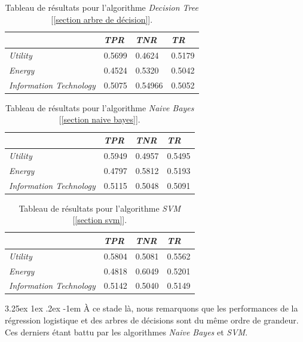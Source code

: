 \documentclass[a4paper, 11pt]{article}
\makeatletter
\renewcommand\paragraph{\@startsection{paragraph}{5}{\z@}%
  {3.25ex \@plus1ex \@minus.2ex}%
  {-1em}%
  {\normalfont\normalsize\bfseries}}
\makeatother
\begin{document}
\begin{table}[h!]
	\centering
\begin{tabular}{|l|l|l|l|}
	\hline
	\ & \textit{TPR} & \textit{TNR} & \textit{TR}\\
	\hline
	\textit{Utility} & 0.5699 & 0.4624 & 0.5179 \\
	\hline
	\textit{Energy} & 0.4524 & 0.5320 & 0.5042\\
	\hline
	\textit{Information Technology} & 0.5075 & 0.54966 & 0.5052\\
	\hline
\end{tabular}
\caption{Tableau de résultats pour l'algorithme \textit{Decision Tree} [\ref{section arbre de décision}].}
\end{table}


\begin{table}[h!]
	\centering
\begin{tabular}{|l|l|l|l|}
	\hline
	\ & \textit{TPR} & \textit{TNR} & \textit{TR}\\
	\hline
	\textit{Utility} & 0.5949 & 0.4957 & 0.5495 \\
	\hline
	\textit{Energy} & 0.4797 & 0.5812 & 0.5193\\
	\hline
	\textit{Information Technology} & 0.5115 & 0.5048 & 0.5091\\
	\hline
\end{tabular}
\caption{Tableau de résultats pour l'algorithme \textit{Naive Bayes} [\ref{section naive bayes}].}
\end{table}

\begin{table}[H]
	\centering
\begin{tabular}{|l|l|l|l|}
	\hline
	\ & \textit{TPR} & \textit{TNR} & \textit{TR}\\
	\hline
	\textit{Utility} & 0.5804 & 0.5081 & 0.5562 \\
	\hline
	\textit{Energy} & 0.4818 & 0.6049 & 0.5201\\
	\hline
	\textit{Information Technology} & 0.5142 & 0.5040 & 0.5149\\
	\hline
\end{tabular}
\caption{Tableau de résultats pour l'algorithme \textit{SVM} [\ref{section svm}].}
\end{table}

\paragraph{}
À ce stade là, nous remarquons que les performances de la régression logistique et des arbres de décisions sont du même ordre de grandeur. Ces derniers étant battu par les algorithmes \textit{Naive Bayes} et \textit{SVM}.
\end{document}
